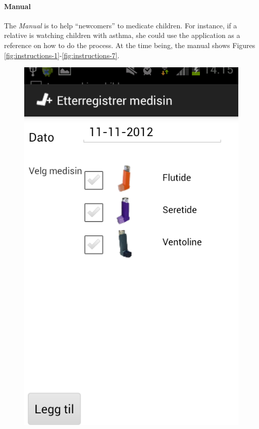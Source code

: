 \paragraph{Manual}
The \emph{Manual} is to help ``newcomers'' to medicate children. For instance, if a relative is watching children with asthma, she could use the application as a reference on how to do the process. At the time being, the manual shows Figures \ref{fig:instructions-1}-\ref{fig:instructions-7}. 
        
\begin{figure}[H]
	\begin{minipage}[b]{0.3\linewidth}
		\centering
		\includegraphics[width=0.20\paperwidth]{Pictures/app-screenshots/register_treatment_old.png}

\end{minipage}
\end{figure}
